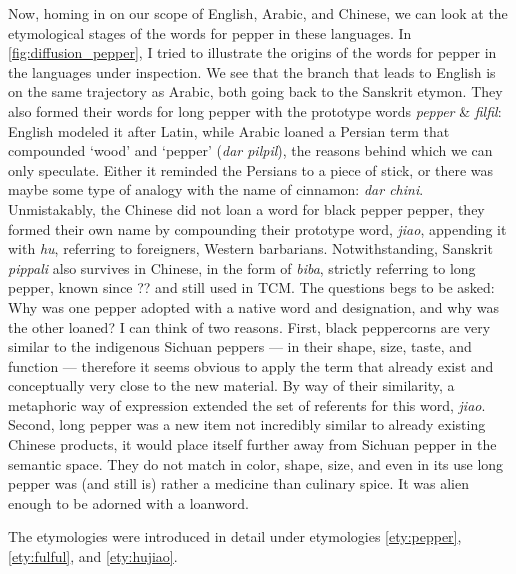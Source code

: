 Now, homing in on our scope of English, Arabic, and Chinese, we can look at the etymological stages of the words for pepper in these languages. In \cref{fig:diffusion_pepper}, I tried to illustrate the origins of the words for pepper in the languages under inspection. We see that the branch that leads to English is on the same trajectory as Arabic, both going back to the Sanskrit etymon. They also formed their words for long pepper with the prototype words \textit{pepper} \& \textit{filfil}: English modeled it after Latin, while Arabic loaned a Persian term that compounded `wood' and `pepper' (\textit{dar pilpil}), the reasons behind which we can only speculate. Either it reminded the Persians to a piece of stick, or there was maybe some type of analogy with the name of cinnamon: \textit{dar chini}. Unmistakably, the Chinese did not loan a word for black pepper pepper, they formed their own name by compounding their prototype word, \textit{jiao}, appending it with \textit{hu}, referring to foreigners, Western barbarians. Notwithstanding, Sanskrit \textit{pippali} also survives in Chinese, in the form of \textit{biba}, strictly referring to long pepper, known since ?? and still used in \gls{TCM}. The questions begs to be asked: Why was one pepper adopted with a native word and designation, and why was the other loaned? I can think of two reasons. First, black peppercorns are very similar to the indigenous Sichuan peppers --- in their shape, size, taste, and function --- therefore it seems obvious to apply the term that already exist and conceptually very close to the new material. By way of their similarity, a metaphoric way of expression extended the set of referents for this word, \textit{jiao}. Second, long pepper was a new item not incredibly similar to already existing Chinese products, it would place itself further away from Sichuan pepper in the semantic space. They do not match in color, shape, size, and even in its use long pepper was (and still is) rather a medicine than culinary spice. It was alien enough to be adorned with a loanword.


The etymologies were introduced in detail under etymologies \ref{ety:pepper}, \ref{ety:fulful}, and \ref{ety:hujiao}.

